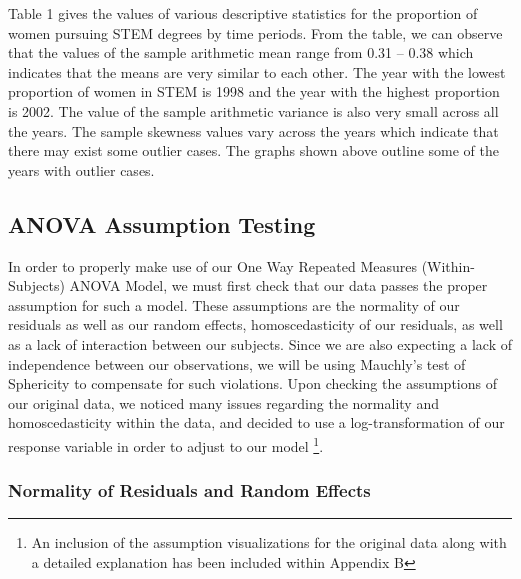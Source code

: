 \documentclass[]{article}
\begin{document}
Table 1 gives the values of various descriptive statistics for the
proportion of women pursuing STEM degrees by time periods. From the
table, we can observe that the values of the sample arithmetic mean
range from 0.31 -- 0.38 which indicates that the means are very similar
to each other. The year with the lowest proportion of women in STEM is
1998 and the year with the highest proportion is 2002. The value of the
sample arithmetic variance is also very small across all the years. The
sample skewness values vary across the years which indicate that there
may exist some outlier cases. The graphs shown above outline some of the
years with outlier cases.

\subsection{ANOVA Assumption Testing}\label{anova-assumption-testing}

In order to properly make use of our One Way Repeated Measures
(Within-Subjects) ANOVA Model, we must first check that our data passes
the proper assumption for such a model. These assumptions are the
normality of our residuals as well as our random effects,
homoscedasticity of our residuals, as well as a lack of interaction
between our subjects. Since we are also expecting a lack of independence
between our observations, we will be using Mauchly's test of Sphericity
to compensate for such violations. Upon checking the assumptions of our
original data, we noticed many issues regarding the normality and
homoscedasticity within the data, and decided to use a
log-transformation of our response variable in order to adjust to our
model
\footnote{An inclusion of the assumption visualizations for the original data along with a detailed explanation has been included within Appendix B}.

\clearpage

\subsubsection{Normality of Residuals and Random
Effects}\label{normality-of-residuals-and-random-effects}
\end{document}
